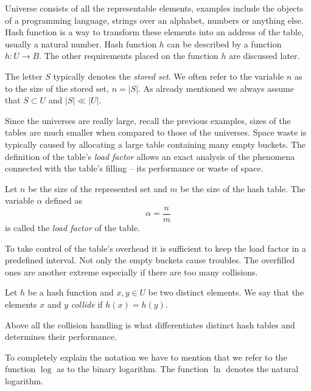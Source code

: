 Universe consists of all the representable elements, examples include the objects of a programming language, strings over an alphabet, numbers or anything else. Hash function is a way to transform these elements into an address of the table, usually a natural number. Hash function $h$ can be described by a function $h: U \rightarrow B$. The other requirements placed on the function $h$ are discussed later.

The letter $S$ typically denotes the \emph{stored set}. We often refer to the variable $n$ as to the size of the stored set, $n = |S|$. As already mentioned we always assume that $S \subset U$ and $|S| \ll |U|$.

Since the universes are really large, recall the previous examples, sizes of the tables are much smaller when compared to those of the universes. Space waste is typically caused by allocating a large table containing many empty buckets. The definition of the table's \emph{load factor} allows an exact analysis of the phenomena connected with the table's filling -- its performance or waste of space.

\begin{definition}
\label{definition-load-factor}
Let $n$ be the size of the represented set and $m$ be the size of the hash table. The variable $\alpha$ defined as \[ \alpha = \frac{n}{m} \] is called the \emph{load factor} of the table.
\end{definition}

To take control of the table's overhead it is sufficient to keep the load factor in a predefined interval. Not only the empty buckets cause troubles. The overfilled ones are another extreme especially if there are too many collisions.
\begin{definition}[Collision]
\label{definition-collision}
Let $h$ be a hash function and $x, y \in U$ be two distinct elements. We say that the elements $x$ and $y$ \emph{collide} if $h(x) = h(y)$.
\end{definition}

Above all the collision handling is what differentiates distinct hash tables and determines their performance.

To completely explain the notation we have to mention that we refer to the function $\log$ as to the binary logarithm. The function $\ln$ denotes the natural logarithm.

